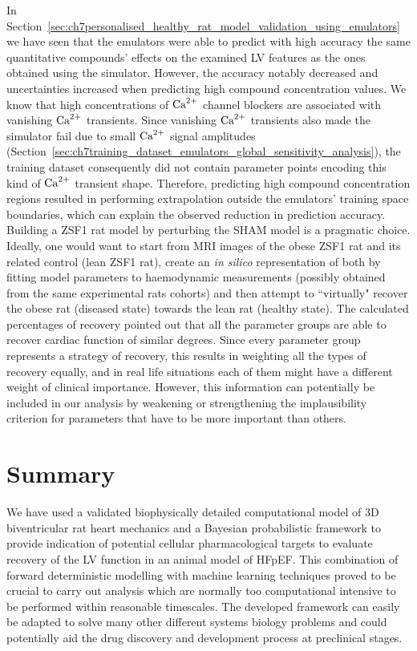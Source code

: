 \vspace{0.2cm}
In Section~\ref{sec:ch7personalised_healthy_rat_model_validation_using_emulators} we have seen that the emulators were able to predict with high accuracy the same quantitative compounds' effects on the examined LV features as the ones obtained using the simulator. However, the accuracy notably decreased and uncertainties increased when predicting high compound concentration values. We know that high concentrations of $\textrm{Ca}^{2+}$ channel blockers are associated with vanishing $\textrm{Ca}^{2+}$ transients. Since vanishing $\textrm{Ca}^{2+}$ transients also made the simulator fail due to small $\textrm{Ca}^{2+}$ signal amplitudes (Section~\ref{sec:ch7training_dataset_emulators_global_sensitivity_analysis}), the training dataset consequently did not contain parameter points encoding this kind of $\textrm{Ca}^{2+}$ transient shape. Therefore, predicting high compound concentration regions resulted in performing extrapolation outside the emulators' training space boundaries, which can explain the observed reduction in prediction accuracy. Building a ZSF1 rat model by perturbing the SHAM model is a pragmatic choice. Ideally, one would want to start from MRI images of the obese ZSF1 rat and its related control (lean ZSF1 rat), create an \textit{in silico} representation of both by fitting model parameters to haemodynamic measurements (possibly obtained from the same experimental rats cohorts) and then attempt to ``virtually" recover the obese rat (diseased state) towards the lean rat (healthy state). The calculated percentages of recovery pointed out that all the parameter groups are able to recover cardiac function of similar degrees. Since every parameter group represents a strategy of recovery, this results in weighting all the types of recovery equally, and in real life situations each of them might have a different weight of clinical importance. However, this information can potentially be included in our analysis by weakening or strengthening the implausibility criterion for parameters that have to be more important than others.


%
%
%
\section{Summary}\label{sec:ch7summary}
We have used a validated biophysically detailed computational model of $3$D biventricular rat heart mechanics and a Bayesian probabilistic framework to provide indication of potential cellular pharmacological targets to evaluate recovery of the LV function in an animal model of HFpEF. This combination of forward deterministic modelling with machine learning techniques proved to be crucial to carry out analysis which are normally too computational intensive to be performed within reasonable timescales. The developed framework can easily be adapted to solve many other different systems biology problems and could potentially aid the drug discovery and development process at preclinical stages.

